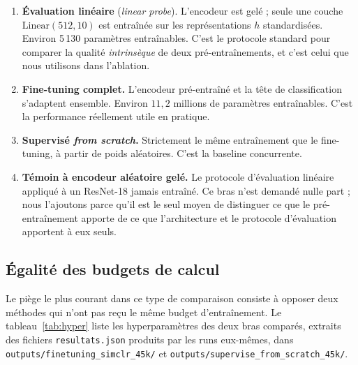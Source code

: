\documentclass[11pt,a4paper]{article}
\begin{document}
\begin{enumerate}
\item \textbf{Évaluation linéaire} (\emph{linear probe}). L'encodeur est gelé ; seule une
couche $\mathrm{Linear}(512, 10)$ est entraînée sur les représentations $h$ standardisées.
Environ 5\,130 paramètres entraînables. C'est le protocole standard pour comparer la qualité
\emph{intrinsèque} de deux pré-entraînements, et c'est celui que nous utilisons dans
l'ablation.
\item \textbf{Fine-tuning complet.} L'encodeur pré-entraîné et la tête de classification
s'adaptent ensemble. Environ $11{,}2$ millions de paramètres entraînables. C'est la
performance réellement utile en pratique.
\item \textbf{Supervisé \emph{from scratch}.} Strictement le même entraînement que le
fine-tuning, à partir de poids aléatoires. C'est la baseline concurrente.
\item \textbf{Témoin à encodeur aléatoire gelé.} Le protocole d'évaluation linéaire appliqué
à un ResNet-18 jamais entraîné. Ce bras n'est demandé nulle part ; nous l'ajoutons parce
qu'il est le seul moyen de distinguer ce que le pré-entraînement apporte de ce que
l'architecture et le protocole d'évaluation apportent à eux seuls.
\end{enumerate}

\subsection{Égalité des budgets de calcul}

Le piège le plus courant dans ce type de comparaison consiste à opposer deux méthodes qui
n'ont pas reçu le même budget d'entraînement. Le tableau~\ref{tab:hyper} liste les
hyperparamètres des deux bras comparés, extraits des fichiers
\texttt{resultats.json} produits par les runs eux-mêmes, dans
\texttt{outputs/finetuning\_simclr\_45k/} et
\texttt{outputs/supervise\_from\_scratch\_45k/}.
\end{document}
